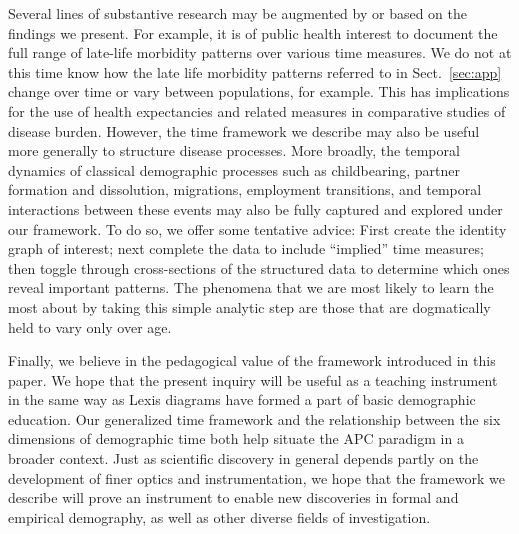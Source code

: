 \documentclass[12pt,oneside,a4paper]{article} %
\theoremstyle{definition}
\DeclareRobustCommand{\VAN}[3]{#2} %
\begin{document}
Several lines of substantive research may be augmented by or based on the
findings we present. For example, it is of public health interest to document
the full range of late-life morbidity patterns over various time measures. We do
not at this time know how the late life morbidity patterns referred to in
Sect.~\ref{sec:app} change over time or vary between populations, for example.
This has implications for the use of health expectancies and related measures in comparative studies of disease burden.
However, the time framework we describe may also be useful more generally to
structure disease processes. More broadly, the temporal dynamics of classical
demographic processes such as childbearing, partner formation and dissolution,
migrations, employment transitions, and temporal interactions between these events may also be fully captured and explored under our framework. To do so, we
offer some tentative advice: First create the identity graph of interest; next
complete the data to include ``implied'' time measures; then toggle through
cross-sections of the structured data to determine which ones reveal important patterns.
The phenomena that we are most likely to learn the most about by taking this
simple analytic step are those that are dogmatically held to vary only over age.

Finally, we believe in the pedagogical value of the framework
introduced in this paper. We hope that the
present inquiry will be useful as a teaching instrument in the same way as Lexis
diagrams have formed a part of basic demographic education.
Our generalized time framework and the relationship between the six dimensions
of demographic time both help situate the APC paradigm in a broader context.
Just as scientific discovery in general depends partly on the development of
finer optics and instrumentation, we hope that the framework we describe will prove an instrument to enable new discoveries in formal and empirical demography, as well as other diverse fields of
investigation.


  
\DeclareRobustCommand{\VAN}[3]{#3}
 
%
 
%  
\end{document}
